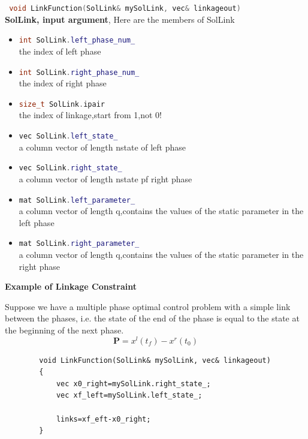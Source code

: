 \documentclass[10pt]{article}
\begin{document}
\begin{itemize}
		\lstinline[language=C++]| void LinkFunction(SolLink& mySolLink, vec& linkageout)|\\
		\textbf{SolLink, input argument}, Here are the members of SolLink 
		\begin{itemize}
			\item \lstinline[language=C++]|int SolLink.left_phase_num_|\\the index of left phase
			\item \lstinline[language=C++]|int SolLink.right_phase_num_|\\the index of right phase
			\item \lstinline[language=C++]|size_t SolLink.ipair|\\the index of linkage,start from 1,not 0!
			\item \lstinline[language=C++]|vec SolLink.left_state_|\\a column vector of length nstate of left phase
			\item \lstinline[language=C++]|vec SolLink.right_state_|\\a column vector of length nstate pf right phase
			\item \lstinline[language=C++]|mat SolLink.left_parameter_|\\a column vector of length q,contains the values of the static parameter in the left phase
			\item \lstinline[language=C++]|mat SolLink.right_parameter_|\\a column vector of length q,contains the values of the static parameter in the right phase
		\end{itemize}	
		\begin{frame}
		{\noindent}{\bf Example of Linkage Constraint }
		
		{\noindent}Suppose we have a multiple phase optimal control problem with a simple link between the phases, i.e. the state of the end of the phase is equal to the state at the beginning of the next phase.  
		\begin{displaymath}
		\mathbf P = x^l(t_f) - x^r(t_0)
		\end{displaymath}
		\begin{lstlisting}
		void LinkFunction(SolLink& mySolLink, vec& linkageout)
		{
			vec x0_right=mySolLink.right_state_;
			vec xf_left=mySolLink.left_state_;
		
			links=xf_eft-x0_right;
		}
		\end{lstlisting}
		
	\end{frame}
	\end{itemize}
\end{document}
